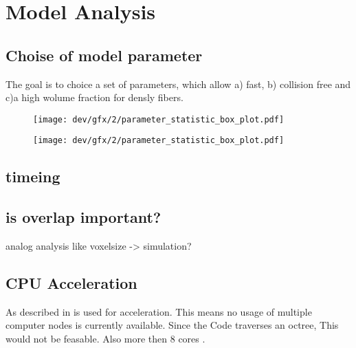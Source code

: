 \setcounter{chapter}{6}
\chapter{Model Analysis}
\label{cha:model_analysis}
% 
\section{Choise of model parameter}
% 
The goal is to choice a set of parameters, which allow a) fast, b) collision free and c)a high wolume fraction for densly fibers. 
% 
\begin{figure}[!t]
\centering
\texttt{[image: dev/gfx/2/parameter\_statistic\_box\_plot.pdf]}
\caption{}
\end{figure}
% 
\begin{figure}[!t]
\centering
\texttt{[image: dev/gfx/2/parameter\_statistic\_box\_plot.pdf]}
\caption{}
\end{figure}
% 
\section{timeing}
% 
\section{is overlap important?}
% 
analog analysis like voxelsize -> simulation?
% 
\section{CPU Acceleration}
% 
As described in \dummy \openmp is used for acceleration.
This means no usage of multiple computer nodes is currently available.
Since the Code traverses an octree, This would not be feasable.
Also more then 8 cores \dummy.
% 
\begin{figure}[!t]
\centering
\def\tikzwidth{\textwidth}
\caption{}
\end{figure}

% 
